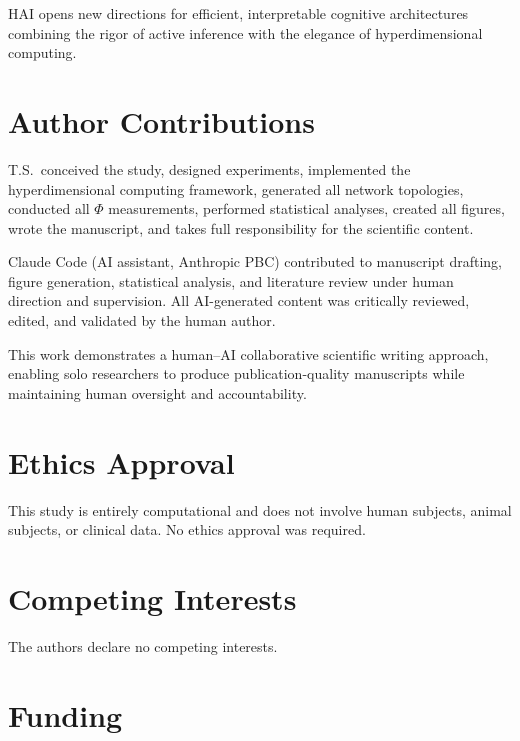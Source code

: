 \documentclass[10pt,letterpaper]{article}
\renewcommand{\Phi}{\varPhi}
\begin{document}
HAI opens new directions for efficient, interpretable cognitive architectures combining the rigor of active inference with the elegance of hyperdimensional computing.

\section*{Author Contributions}

T.S.\ conceived the study, designed experiments, implemented the hyperdimensional
computing framework, generated all network topologies, conducted all $\Phi$
measurements, performed statistical analyses, created all figures, wrote the
manuscript, and takes full responsibility for the scientific content.

Claude Code (AI assistant, Anthropic PBC) contributed to manuscript drafting,
figure generation, statistical analysis, and literature review under human
direction and supervision. All AI-generated content was critically reviewed,
edited, and validated by the human author.

This work demonstrates a human--AI collaborative scientific writing approach,
enabling solo researchers to produce publication-quality manuscripts while
maintaining human oversight and accountability.

\section*{Ethics Approval}

This study is entirely computational and does not involve human subjects,
animal subjects, or clinical data. No ethics approval was required.

\section*{Competing Interests}

The authors declare no competing interests.

\section*{Funding}
\end{document}
